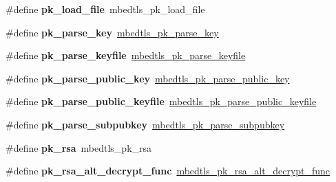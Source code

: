 \begin{DoxyCompactItemize}
\mbox{\label{compat-1_83_8h_a8367904e04aebdb9186a76d48e512301}} 
\#define {\bfseries pk\+\_\+load\+\_\+file}~mbedtls\+\_\+pk\+\_\+load\+\_\+file
\item 
\mbox{\label{compat-1_83_8h_a9c3996433e9c651455157b2d2f0fbefd}} 
\#define {\bfseries pk\+\_\+parse\+\_\+key}~\mbox{\hyperlink{pk_8h_a072d27dc4143bfd600786232f9417e08}{mbedtls\+\_\+pk\+\_\+parse\+\_\+key}}
\item 
\mbox{\label{compat-1_83_8h_aeb7a8944562a48e16dc8b692771759ad}} 
\#define {\bfseries pk\+\_\+parse\+\_\+keyfile}~\mbox{\hyperlink{pk_8h_a935d710e542409462d0209f2381da83e}{mbedtls\+\_\+pk\+\_\+parse\+\_\+keyfile}}
\item 
\mbox{\label{compat-1_83_8h_ad3f775ca05ea037e9ceba5f8d0334835}} 
\#define {\bfseries pk\+\_\+parse\+\_\+public\+\_\+key}~\mbox{\hyperlink{pk_8h_ade680bf8e87df7ccc3bb36b52e43972b}{mbedtls\+\_\+pk\+\_\+parse\+\_\+public\+\_\+key}}
\item 
\mbox{\label{compat-1_83_8h_a2b5665045753c4912a79b4a31b23009d}} 
\#define {\bfseries pk\+\_\+parse\+\_\+public\+\_\+keyfile}~\mbox{\hyperlink{pk_8h_af5a0ae67100c005638bb74f575ee4ad6}{mbedtls\+\_\+pk\+\_\+parse\+\_\+public\+\_\+keyfile}}
\item 
\mbox{\label{compat-1_83_8h_aa221401c4624d4a39ce04add8c3b1814}} 
\#define {\bfseries pk\+\_\+parse\+\_\+subpubkey}~\mbox{\hyperlink{pk_8h_a261a06b48443981316e19bd1c2c377f9}{mbedtls\+\_\+pk\+\_\+parse\+\_\+subpubkey}}
\item 
\mbox{\label{compat-1_83_8h_a4486eb0a23258bbdd5271c97cfd0872c}} 
\#define {\bfseries pk\+\_\+rsa}~mbedtls\+\_\+pk\+\_\+rsa
\item 
\mbox{\label{compat-1_83_8h_aa0810e66b8b0ad25fb61555a4cd1511f}} 
\#define {\bfseries pk\+\_\+rsa\+\_\+alt\+\_\+decrypt\+\_\+func}~\mbox{\hyperlink{pk_8h_a01453ce20b7a8d47aaecd90ef9997e24}{mbedtls\+\_\+pk\+\_\+rsa\+\_\+alt\+\_\+decrypt\+\_\+func}}
\item 
\mbox{\label{compat-1_83_8h_a9a71eba62cea84cc73dde52c1bde3a90}} 

\end{DoxyCompactItemize}
